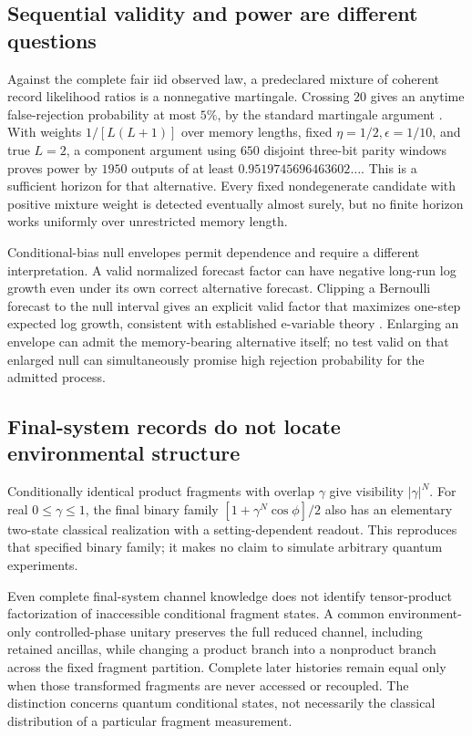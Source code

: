 \subsection{Sequential validity and power are different questions}

Against the complete fair iid observed law, a predeclared mixture of
coherent record likelihood ratios is a nonnegative martingale.
Crossing \(20\) gives an anytime false-rejection probability at most
\(5\%\), by the standard martingale argument \cite{op:howard}.
With weights \(1/[L(L+1)]\) over memory lengths, fixed
\(\eta=1/2,\epsilon=1/10\), and true \(L=2\), a component argument using
\(650\) disjoint three-bit parity windows proves power by \(1950\)
outputs of at least \(0.9519745696463602\ldots\).
This is a sufficient horizon for that alternative.  Every fixed
nondegenerate candidate with positive mixture weight is detected
eventually almost surely, but no finite horizon works uniformly over
unrestricted memory length.

Conditional-bias null envelopes permit dependence and require a
different interpretation.  A valid normalized forecast factor can have
negative long-run log growth even under its own correct alternative
forecast.  Clipping a Bernoulli forecast to the null interval gives an
explicit valid factor that maximizes one-step expected log growth,
consistent with established e-variable theory \cite{op:larsson}.
Enlarging an envelope can admit the memory-bearing alternative itself;
no test valid on that enlarged null can simultaneously promise high
rejection probability for the admitted process.

\subsection{Final-system records do not locate environmental structure}

Conditionally identical product fragments with overlap \(\gamma\) give
visibility \(|\gamma|^N\).  For real \(0\le\gamma\le1\), the final binary
family \([1+\gamma^N\cos\phi]/2\) also has an elementary two-state classical
realization with a setting-dependent readout.  This reproduces that
specified binary family; it makes no claim to simulate arbitrary quantum
experiments.

Even complete final-system channel knowledge does not identify
tensor-product factorization of inaccessible conditional fragment
states.  A common environment-only controlled-phase unitary preserves
the full reduced channel, including retained ancillas, while changing a
product branch into a nonproduct branch across the fixed fragment
partition.  Complete later histories remain equal only when those
transformed fragments are never accessed or recoupled.
The distinction concerns quantum conditional states, not necessarily
the classical distribution of a particular fragment measurement.

